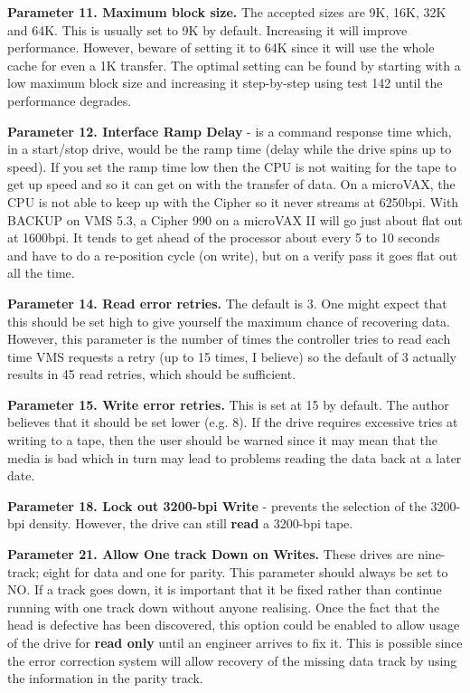 {\bf Parameter 11.  Maximum block size.} The accepted sizes are
9K, 16K, 32K and 64K. This is usually set to 9K by default.
Increasing it will improve performance. However, beware of setting it to 64K
since it will use the whole cache for even a 1K transfer. The optimal setting
can be found by starting with a low maximum block size and increasing it
step-by-step using test 142 until the performance degrades. 


{\bf Parameter 12. Interface Ramp Delay} -  is a command 
response time which, in a start/stop drive, would be the ramp time (delay while
the drive spins up to speed).  If you set the ramp time low then the CPU is not
waiting for the tape to get up speed and so it can get on with the transfer of
data. On a microVAX, the CPU is not able to keep up with the Cipher so it never
streams at 6250bpi.  With BACKUP on VMS 5.3, a Cipher 990 on a microVAX II will go
just about flat out at 1600bpi. It tends to get ahead of the processor about
every 5 to 10 seconds and have to do a re-position cycle (on write), but on a
verify pass it goes flat out all the time.

{\bf Parameter 14.  Read error retries.} The default is 3. One might  expect that this should be
set high to give yourself the maximum chance of recovering  data. However, this
parameter is the number of times the controller tries to read each time 
VMS requests a retry (up to 15 times, I believe) so the default of 3 actually
results in 45 read retries, which should be sufficient. 

{\bf Parameter 15.  Write error retries.}  This is set at 15 by default. The author believes that
it should be set lower (e.g. 8). If the drive requires excessive tries at
writing to  a tape, then the user should be warned since it may mean that the media
is bad which in turn may lead to problems reading the data back at a later
date.

{\bf Parameter 18. Lock out 3200-bpi Write} - prevents the selection of the 
3200-bpi density. However, the drive can still {\bf read} a 3200-bpi tape.

{\bf Parameter 21.  Allow One track Down on Writes.} These drives are nine-track; eight for data
and one for parity. This parameter should always be set to NO. If a track goes down,
it is important that it be fixed rather than continue running with one
track down without anyone realising. Once the fact that the head is 
defective has been discovered, this option could be enabled to allow
usage of the drive for {\bf read only} until an engineer arrives to fix it. This is
possible since the error correction system will allow recovery of the missing data track
by  using the information in the parity track. 

